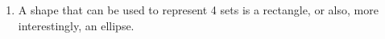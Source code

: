 \documentclass{article}
\begin{document}
\begin{enumerate}
\begin{enumerate}
\item
  A shape that can be used to represent 4 sets is a rectangle, or also, more interestingly, an ellipse.
  \end{enumerate}
\end{enumerate}
\end{document}
